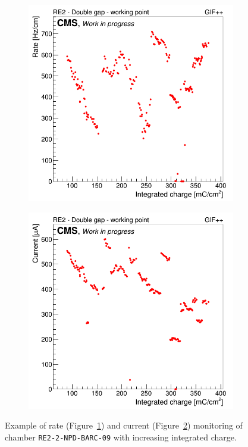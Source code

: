 	\begin{figure}[H]
    	\begin{subfigure}{0.5\linewidth}
			\centering
    		\includegraphics[width = 0.5\plotwidth]{fig/chapt5/GIFpp-Rate-vs-Q.png}
        	\caption{\label{fig:rate-I-monitor:A}}
    	\end{subfigure}
    	\begin{subfigure}{0.5\linewidth}
			\centering
    		\includegraphics[width = 0.5\plotwidth]{fig/chapt5/GIFpp-I-vs-Q.png}
        	\caption{\label{fig:rate-I-monitor:B}}
    	\end{subfigure}
		\caption{\label{fig:rate-I-monitor} Example of rate (Figure~\ref{fig:rate-I-monitor:A}) and current (Figure~\ref{fig:rate-I-monitor:B}) monitoring of chamber \texttt{RE2-2-NPD-BARC-09} with increasing integrated charge.}
	\end{figure}

